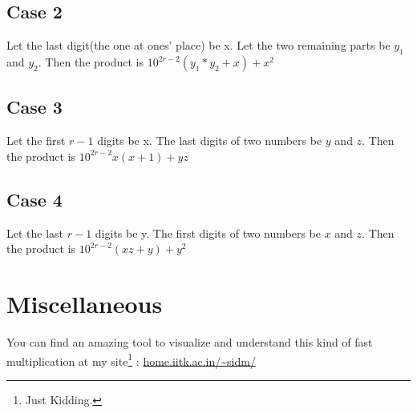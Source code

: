 \documentclass[titlepage]{article}
\begin{document}
\subsection{Case 2}
Let the last digit(the one at ones' place) be x. Let the two remaining parts be $y_1$ and $y_2$. Then the product is $10^{2r-2}(y_1*y_2+x)+x^2$
\subsection{Case 3}
Let the first $r-1$ digits be x. The last digits of two numbers be $y$ and $z$. Then the product is $10^{2r-2}x(x + 1)+yz$
\subsection{Case 4}
Let the last $r-1$ digits be y. The first digits of two numbers be $x$ and $z$. Then the product is $10^{2r-2}(xz+y)+y^2$
\newpage
\section{Miscellaneous}
\label{sec:misc}
You can find an amazing tool to visualize and understand this kind of fast multiplication at my site\footnote{Just Kidding.} : \url{home.iitk.ac.in/~sidm/}


\end{document}
